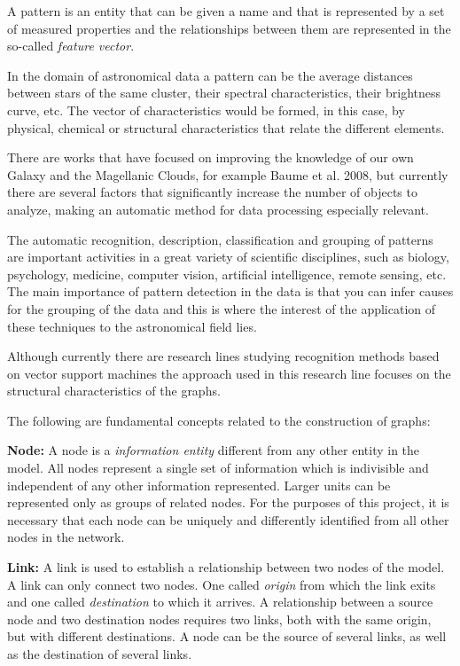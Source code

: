 \ifdefined\ingles	
	A pattern is an entity that can be given a name and that is represented by a set of measured properties and the relationships between them are represented in the so-called \emph{feature vector}\cite{watanabe1985pattern}.
	
	In the domain of astronomical data a pattern can be the average distances between stars of the same cluster, their spectral characteristics, their brightness curve, etc. The vector of characteristics would be formed, in this case, by physical, chemical or structural characteristics that relate the different elements.
	
	There are works that have focused on improving the knowledge of our own Galaxy and the Magellanic Clouds, for example Baume et al. 2008\cite{baume2008basic}, but currently there are several factors that significantly increase the number of objects to analyze, making an automatic method for data processing especially relevant.
	
	The automatic recognition, description, classification and grouping of patterns are important activities in a great variety of scientific disciplines, such as biology, psychology, medicine, computer vision, artificial intelligence, remote sensing, etc. The main importance of pattern detection in the data is that you can infer causes for the grouping of the data and this is where the interest of the application of these techniques to the astronomical field lies.
	
	Although currently there are research lines studying recognition methods based on vector support machines\cite{burges1998tutorial} the approach used in this research line focuses on the structural characteristics of the graphs\cite{bunke1983inexact, pavlidis2013}.
	
	The following are fundamental concepts related to the construction of graphs:
	
	\textbf{Node:} A node is a \emph{information entity} different from any other entity in the model. All nodes represent a single set of information which is indivisible and independent of any other information represented. Larger units can be represented only as groups of related nodes. For the purposes of this project, it is necessary that each node can be uniquely and differently identified from all other nodes in the network.
	
	\textbf{Link:} A link is used to establish a relationship between two nodes of the model.
	A link can only connect two nodes. One called \emph{origin} from which the link exits and one called \emph{destination} to which it arrives. A relationship between a source node and two destination nodes requires two links, both with the same origin, but with different destinations. A node can be the source of several links, as well as the destination of several links\cite{van2010graph, bondy1976graph}.
	
